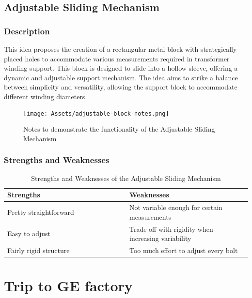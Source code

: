 \documentclass[a4paper,10pt]{article}
\begin{document}
\subsection{Adjustable Sliding Mechanism}

\subsubsection{Description}

This idea proposes the creation of a rectangular metal block with strategically placed holes to accommodate various measurements required in transformer winding support. This block is designed to slide into a hollow sleeve, offering a dynamic and adjustable support mechanism. The idea aims to strike a balance between simplicity and versatility, allowing the support block to accommodate different winding diameters.

\begin{figure}[H]
  \centering
  \texttt{[image: Assets/adjustable-block-notes.png]}
  \caption{Notes to demonstrate the functionality of the Adjustable Sliding Mechanism}
  \label{fig:adjustable-block-notes}
\end{figure}

\subsubsection{Strengths and Weaknesses}

\begin{table}[h]
  \centering
  \begin{tabular}{p{0.5\linewidth} | p{0.5\linewidth}}
    Strengths                                              & Weaknesses \\ \hline
    \textbullet{} Pretty straightforward                   & \textbullet{} Not variable enough for certain measurements \\
    \textbullet{} Easy to adjust                           & \textbullet{} Trade-off with rigidity when increasing variability \\
    \textbullet{} Fairly rigid structure                   & \textbullet{} Too much effort to adjust every bolt \\
  \end{tabular}
  \caption{Strengths and Weaknesses of the Adjustable Sliding Mechanism}
  \label{table:adjustable-block-pros-cons}
\end{table}

\section{Trip to GE factory}
\end{document}
